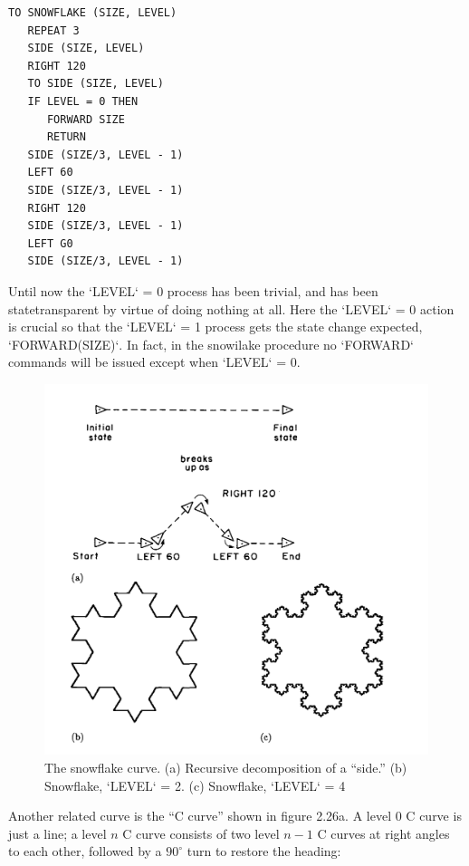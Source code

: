 \documentclass{book}
\begin{document}
\begin{verbatim}
TO SNOWFLAKE (SIZE, LEVEL)
   REPEAT 3
   SIDE (SIZE, LEVEL)
   RIGHT 120
   TO SIDE (SIZE, LEVEL)
   IF LEVEL = 0 THEN
      FORWARD SIZE
      RETURN
   SIDE (SIZE/3, LEVEL - 1)
   LEFT 60
   SIDE (SIZE/3, LEVEL - 1)
   RIGHT 120
   SIDE (SIZE/3, LEVEL - 1)
   LEFT G0
   SIDE (SIZE/3, LEVEL - 1)
\end{verbatim}
Until now the \textsc{`LEVEL`} = 0 process has been trivial, and has been statetransparent by virtue of doing nothing at all. Here the \textsc{`LEVEL`} = 0 action
is crucial so that the \textsc{`LEVEL`} = 1 process gets the state change expected,
\textsc{`FORWARD(SIZE)`}. In fact, in the snowilake procedure no \textsc{`FORWARD`} commands will be issued except when \textsc{`LEVEL`} = 0.

\begin{figure}
\begin{center}
\includegraphics[scale=1]{fig2-25}
\caption{The snowflake curve. (a) Recursive decomposition of a ``side.'' (b) Snowflake, \textsc{`LEVEL`} = 2. (c) Snowflake, \textsc{`LEVEL`} = 4}
\end{center}
\end{figure}


Another related curve is the ``C curve'' shown in figure 2.26a. A level
0 C curve is just a line; a level $n$ C curve consists of two level $n - 1$ C
curves at right angles to each other, followed by a $90^{\circ}$ turn to restore
the heading:
\end{document}
